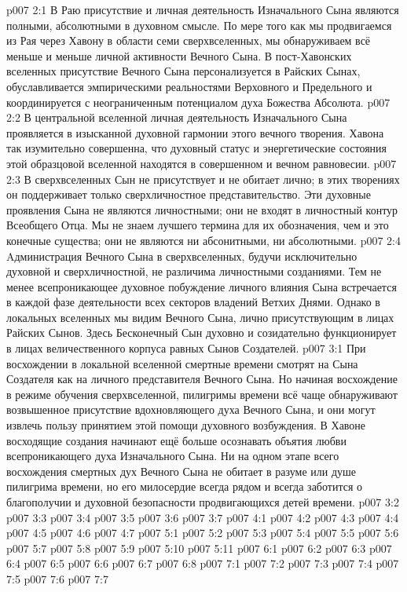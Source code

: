 \vs p007 2:1 В Раю присутствие и личная деятельность Изначального Сына являются полными, абсолютными в духовном смысле. По мере того как мы продвигаемся из Рая через Хавону в области семи сверхвселенных, мы обнаруживаем всё меньше и меньше личной активности Вечного Сына. В пост\hyp{}Хавонских вселенных присутствие Вечного Сына персонализуется в Райских Сынах, обуславливается эмпирическими реальностями Верховного и Предельного и координируется с неограниченным потенциалом духа Божества Абсолюта.
\vs p007 2:2 В центральной вселенной личная деятельность Изначального Сына проявляется в изысканной духовной гармонии этого вечного творения. Хавона так изумительно совершенна, что духовный статус и энергетические состояния этой образцовой вселенной находятся в совершенном и вечном равновесии.
\vs p007 2:3 В сверхвселенных Сын не присутствует и не обитает лично; в этих творениях он поддерживает только сверхличностное представительство. Эти духовные проявления Сына не являются личностными; они не входят в личностный контур Всеобщего Отца. Мы не знаем лучшего термина для их обозначения, чем  и это конечные существа; они не являются ни абсонитными, ни абсолютными.
\vs p007 2:4 Aдминистрация Вечного Сына в сверхвселенных, будучи исключительно духовной и сверхличностной, не различима личностными созданиями. Тем не менее всепроникающее духовное побуждение личного влияния Сына встречается в каждой фазе деятельности всех секторов владений Ветхих Днями. Однако в локальных вселенных мы видим Вечного Сына, лично присутствующим в лицах Райских Сынов. Здесь Бесконечный Сын духовно и созидательно функционирует в лицах величественного корпуса равных Сынов Создателей.
\vs p007 3:1 При восхождении в локальной вселенной смертные времени смотрят на Сына Создателя как на личного представителя Вечного Сына. Но начиная восхождение в режиме обучения сверхвселенной, пилигримы времени всё чаще обнаруживают возвышенное присутствие вдохновляющего духа Вечного Сына, и они могут извлечь пользу принятием этой помощи духовного возбуждения. В Хавоне восходящие создания начинают ещё больше осознавать объятия любви всепроникающего духа Изначального Сына. Ни на одном этапе всего восхождения смертных дух Вечного Сына не обитает в разуме или душе пилигрима времени, но его милосердие всегда рядом и всегда заботится о благополучии и духовной безопасности продвигающихся детей времени.
\vs p007 3:2
\vs p007 3:3 \pc
\vs p007 3:4 \pc
\vs p007 3:5
\vs p007 3:6
\vs p007 3:7
\vs p007 4:1
\vs p007 4:2
\vs p007 4:3 \pc
\vs p007 4:4
\vs p007 4:5
\vs p007 4:6
\vs p007 4:7 \pc
{}
\vs p007 5:1
\vs p007 5:2
\vs p007 5:3
\vs p007 5:4
\vs p007 5:5 \pc
\vs p007 5:6
\vs p007 5:7 \pc
\vs p007 5:8 \pc
\vs p007 5:9
\vs p007 5:10 \pc
\vs p007 5:11
\vs p007 6:1
\vs p007 6:2
\vs p007 6:3 \pc
\vs p007 6:4
\vs p007 6:5 \pc
\vs p007 6:6 \pc
\vs p007 6:7 \pc
\vs p007 6:8
\vs p007 7:1
\vs p007 7:2
\vs p007 7:3
\vs p007 7:4
\vs p007 7:5 \pc
\vs p007 7:6
\vsetoff
\vs p007 7:7
\quizlink
